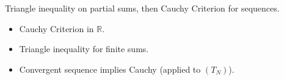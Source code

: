 \begin{remark*}
Triangle inequality on partial sums, then Cauchy Criterion for sequences.
\end{remark*}

\begin{remark*}[Dependencies]
\begin{itemize}
  \item Cauchy Criterion in $\mathbb{R}$.
  \item Triangle inequality for finite sums.
  \item Convergent sequence implies Cauchy (applied to $(T_N)$).
\end{itemize}
\end{remark*}
